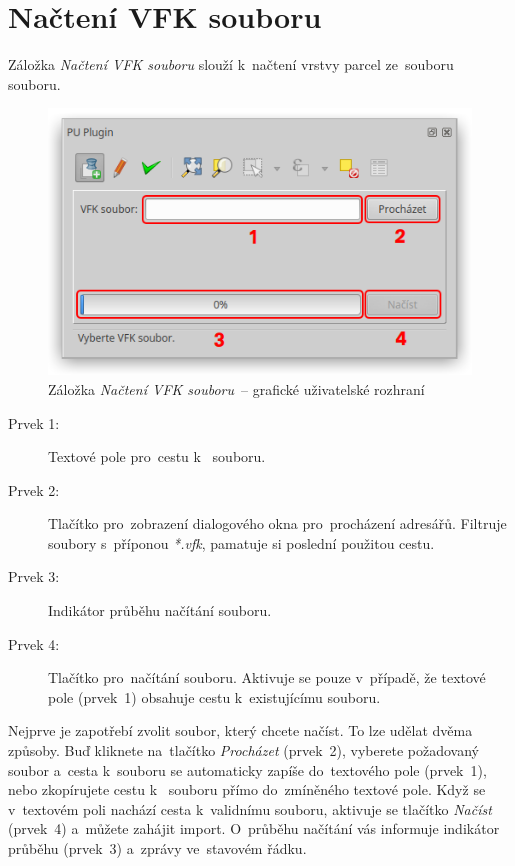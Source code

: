 \newpage

\section{Načtení VFK souboru}
\label{manual_nacteni_vfk}

Záložka \textit{Načtení VFK souboru} slouží k~načtení vrstvy parcel ze~souboru~ souboru.

	\begin{figure}[H]
		\centering
		\includegraphics[width=.55\textwidth]{./pictures/nacteni_vfk_gui.png}
		\caption[Záložka \textit{Načtení VFK souboru}~– grafické uživatelské rozhraní]{Záložka \textit{Načtení VFK souboru}~– grafické uživatelské rozhraní}
		\label{fig:manual_nacteni_vfk_gui}
 	\end{figure}

\begin{description}
	\item[Prvek 1:] Textové pole pro~cestu k~ souboru.
	\item[Prvek 2:] Tlačítko pro~zobrazení dialogového okna pro~procházení adresářů. Filtruje soubory s~příponou \textit{*.vfk}, pamatuje si poslední použitou cestu.
	\item[Prvek 3:] Indikátor průběhu načítání  souboru.
	\item[Prvek 4:] Tlačítko pro~načítání  souboru. Aktivuje se pouze v~případě, že textové pole (prvek~1) obsahuje cestu k~existujícímu  souboru.
\end{description}

Nejprve je zapotřebí zvolit  soubor, který chcete načíst. To lze udělat dvěma způsoby. Buď kliknete na~tlačítko \textit{Procházet} (prvek~2), vyberete požadovaný soubor a~cesta k~souboru se automaticky zapíše do~textového pole (prvek~1), nebo zkopírujete cestu k~ souboru přímo do~zmíněného textové pole. Když se v~textovém poli nachází cesta k~validnímu  souboru, aktivuje se tlačítko \textit{Načíst} (prvek~4) a~můžete zahájit import. O~průběhu načítání vás informuje indikátor průběhu (prvek~3) a~zprávy ve~stavovém řádku.

